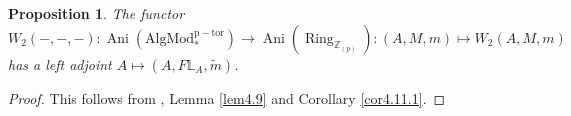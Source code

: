 \documentclass[11pt, a4paper]{amsart}
\theoremstyle{plain}
\newtheorem{prop}[theorem]{Proposition}
\newtheorem{coro}[theorem]{Corollary}
\theoremstyle{definition}
\begin{document}
\begin{prop}\label{pro4.10}
    The functor \[W_2(-,-,-):\operatorname{Ani}(\operatorname{AlgMod^{p-tor}_*})\to \operatorname{Ani}(\operatorname{Ring}_{\mathbb Z_{(p)}}):(A,M,m)\mapsto W_2(A,M,m)\] has a left adjoint $A\mapsto (A,F\mathbb L_A,\widetilde m)$.
\end{prop}
\begin{proof}
    This follows from \cite[Corollary 2.3]{Mao24}, Lemma \ref{lem4.9} and Corollary \ref{cor4.11.1}.
\end{proof}
\end{document}
